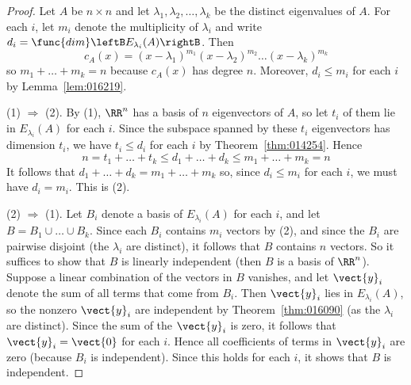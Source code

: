 \begin{proof}
Let $A$ be $n \times n$ and let $\lambda_{1}, \lambda_{2}, \dots, \lambda_{k}$ be the distinct
eigenvalues of $A$. For each $i$, let $m_{i}$ denote the multiplicity of $\lambda_{i}$ and write $d_{i} = \func{dim}\leftB E_{\lambda_i}(A) \rightB$. Then
\begin{equation*}
c_A(x) = (x - \lambda_1)^{m_1}(x - \lambda_2)^{m_2}\dots (x - \lambda_k)^{m_k}
\end{equation*}
so $m_{1} + \dots + m_{k} = n$ because $c_{A}(x)$ has degree $n$. Moreover, $d_{i} \leq m_{i}$ for each $i$ by Lemma~\ref{lem:016219}.

(1) $\Rightarrow$ (2). By (1), $\RR^n$ has a basis of $n$ eigenvectors
of $A$, so let $t_{i}$ of them lie in $E_{\lambda_i}(A)$ for each $i$. Since the subspace spanned by these $t_{i}$ eigenvectors has dimension $t_{i}$, we have $t_{i} \leq d_{i}$ for each $i$ by Theorem~\ref{thm:014254}. Hence
\begin{equation*}
n = t_1 + \dots + t_k \leq d_1 + \dots + d_k \leq m_1 + \dots + m_k = n
\end{equation*}
It follows that $d_1 + \dots + d_k = m_1 + \dots + m_k$ so, since $d_{i} \leq m_{i}$ for each $i$, we must have $d_{i} = m_{i}$. This is (2).

(2) $\Rightarrow$ (1). Let $B_{i}$ denote a basis of $E_{\lambda_i}(A)$ for each $i$, and let $B = B_{1} \cup \dots \cup B_{k}$. Since each $B_{i}$ contains $m_{i}$ vectors by (2), and since the $B_{i}$ are pairwise disjoint (the $\lambda_{i}$ are distinct), it follows that $B$ contains $n$ vectors. So it suffices to show that $B$ is linearly independent (then $B$ is a basis of $\RR^n$). Suppose a linear combination of the vectors in $B$ vanishes, and let $\vect{y}_{i}$ denote the sum of all terms that come from $B_{i}$. Then $\vect{y}_{i}$ lies in $E_{\lambda_i}(A)$, so the nonzero $\vect{y}_{i}$ are independent by Theorem~\ref{thm:016090} (as the $\lambda_{i}$ are distinct). Since the sum of the $\vect{y}_{i}$ is zero, it follows that $\vect{y}_{i} = \vect{0}$ for each $i$. Hence all coefficients of terms in $\vect{y}_{i}$ are zero (because $B_{i}$ is independent). Since this holds for each $i$, it shows that $B$ is independent.
\end{proof}

